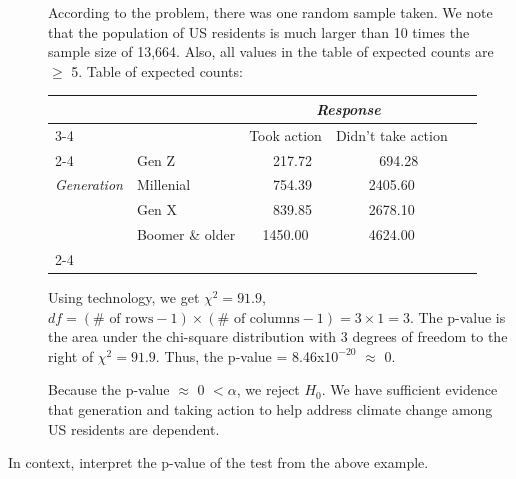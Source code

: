 \begin{examplewrap}
\begin{nexample}
\begin{description}
\item[] According to the problem, there was one random sample taken.  We note that the population of US residents is much larger than 10 times the sample size of 13,664.  Also, all values in the table of expected counts are $\ge$ 5.
Table of expected counts:
\begin{center}
\begin{tabular}{l l c c l}
								&			& \multicolumn{2}{c}{\textit{Response}}	&\hspace{17mm}\ 		\\
\cline{3-4}
								&			& Took action		& Didn't take action	\\
\cline{2-4}
								& Gen Z			& \ \ 217.72		& \ \ 694.28	\\
\textit{Generation}					& Millenial		& \ \ 754.39		& 2405.60	\\
								& Gen X			& \ \ 839.85		& 2678.10	\\
								& Boomer \& older	& 1450.00		& 4624.00	\\
\cline{2-4}
\end{tabular}
\end{center}

\item[]  Using technology, we get $\chi^2 = 91.9$, $df = (\# \text{ of rows} - 1) \times (\# \text{ of columns} - 1) = 3\times 1 = 3$.  The p-value is the area under the chi-square distribution with 3 degrees of freedom to the right of $\chi^2=91.9$.  Thus, the p-value = 8.46x$10^{-20}$ $\approx$ 0.
\item[]  Because the p-value $\approx$ 0 $ < \alpha$, we reject $H_0$. We have sufficient evidence that generation and taking action to help address climate change among US residents are dependent.
\end{description}
\end{nexample}
\end{examplewrap}

\begin{exercisewrap}
\begin{nexercise}
In context, interpret the p-value of the test from the above example.\footnotemark
\end{nexercise}
\end{exercisewrap}

